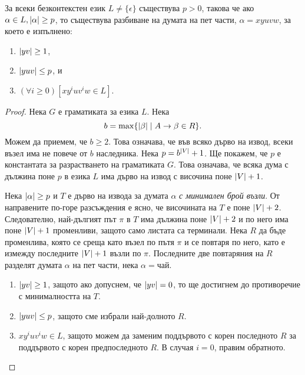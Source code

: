 \begin{lemma}
  \label{lem:pumping-context} 
  За всеки безконтекстен език $L\neq\{\epsilon\}$ съществува $p>0$, такова
  че ако $\alpha\in L, \lvert{\alpha}\rvert \geq p$, то съществува разбиване на думата на пет части, $\alpha=xyuvw$,
  за което е изпълнено:
  \begin{enumerate}[1)]
  \item
    $\lvert{yv}\rvert\geq 1$,
  \item
    $\lvert{yuv}\rvert\leq p$, и
  \item
    $(\forall i\geq 0)[xy^iuv^iw\in L]$.
\end{enumerate}
\end{lemma}
\begin{proof}
  Нека $G$ е граматиката за езика $L$.
  Нека \[b = \max\{\lvert{\beta}\rvert \mid A\rightarrow\beta\in R\}.\]
  Можем да приемем, че $b \geq 2$.
  Това означава, че във всяко дърво на извод, всеки възел има
  не повече от $b$ наследника.
  Нека $p = b^{\lvert{V}\rvert}+1$. Ще покажем, че $p$ е константата за разрастването на граматиката $G$.
  Това означава, че всяка дума с дължина поне $p$ в езика $L$ има дърво на извод с височина
  поне $\lvert{V}\rvert + 1$.
  
  Нека $\lvert{\alpha}\rvert \geq p$ и $T$ е дърво на извода за думата $\alpha$ {\em с минимален брой възли}. 
  От направените по-горе разсъждения е ясно, че височината на $T$ е поне $\lvert{V}\rvert + 2$.
  Следователно, най-дългият път $\pi$ в $T$ има дължина поне $\lvert{V}\rvert+2$ и 
  по него има поне $\lvert{V}\rvert+1$ променливи, защото само листата са терминали.
  Нека $R$ да бъде променлива, която се среща като възел по пътя $\pi$ и се повтаря по него, като е измежду последните $\lvert{V}\rvert + 1$
  възли по $\pi$.
  Последните две повтаряния на $R$ разделят думата $\alpha$ на пет части, нека
  $\alpha = чай$.
  \begin{enumerate}[1)]
  \item
    $\lvert{yv}\rvert\geq 1$,
    защото ако допуснем, че $\lvert{yv}\rvert = 0$,
    то ще достигнем до противоречие с минималността на $T$.
  \item
    $\lvert{yuv}\rvert \leq p$, защото сме избрали най-долното $R$.
  \item
    $xy^iuv^iw \in L$, защото можем да заменим поддървото 
    с корен последното $R$ за поддървото с корен предпоследното $R$.
    В случая $i = 0$, правим обратното.
  \end{enumerate}
\end{proof}

